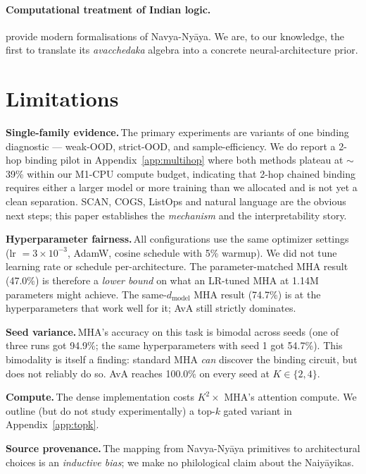 \documentclass{article}
\begin{document}
\paragraph{Computational treatment of Indian logic.}
\citet{ganeri2001philosophy, matilal1968navya, wada2007navya} provide
modern formalisations of Navya-Ny\=aya. We are, to our knowledge, the
first to translate its \emph{avacchedaka} algebra into a concrete
neural-architecture prior.

\section{Limitations}
\label{sec:limitations}

\textbf{Single-family evidence.}\,The primary experiments are
variants of one binding diagnostic --- weak-OOD, strict-OOD, and
sample-efficiency. We do report a 2-hop binding pilot in
Appendix~\ref{app:multihop} where both methods plateau at $\sim$39\%
within our M1-CPU compute budget, indicating that 2-hop chained
binding requires either a larger model or more training than we
allocated and is not yet a clean separation. SCAN, COGS, ListOps and
natural language are the obvious next steps; this paper establishes
the \emph{mechanism} and the interpretability story.

\textbf{Hyperparameter fairness.}\,All configurations use the same
optimizer settings (lr $= 3\times 10^{-3}$, AdamW, cosine schedule with
5\% warmup). We did not tune learning rate or schedule per-architecture.
The parameter-matched MHA result (47.0\%) is therefore a
\emph{lower bound} on what an LR-tuned MHA at 1.14M parameters might
achieve. The same-$d_{\text{model}}$ MHA result (74.7\%) is at the
hyperparameters that work well for it; AvA still strictly dominates.

\textbf{Seed variance.}\,MHA's accuracy on this task is bimodal across
seeds (one of three runs got 94.9\%; the same hyperparameters with
seed 1 got 54.7\%). This bimodality is itself a finding: standard MHA
\emph{can} discover the binding circuit, but does not reliably do so.
AvA reaches 100.0\% on every seed at $K \in \{2, 4\}$.

\textbf{Compute.}\,The dense implementation costs $K^2 \times$ MHA's
attention compute. We outline (but do not study experimentally) a
top-$k$ gated variant in Appendix~\ref{app:topk}.

\textbf{Source provenance.}\,The mapping from Navya-Ny\=aya primitives
to architectural choices is an \emph{inductive bias}; we make no
philological claim about the Naiy\=ayikas.
\end{document}
